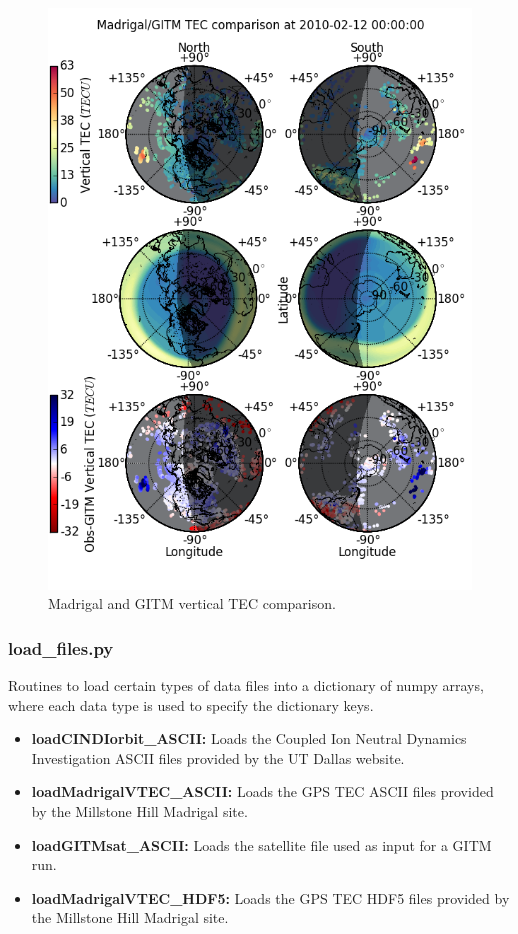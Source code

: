 \begin{figure}
\begin{center}
\noindent\includegraphics[width=.9 \textwidth]{Figures/gitm_tec_comp.png}
\caption{Madrigal and GITM vertical TEC comparison.}
\label{teccomp.fig}
\end{center}
\end{figure}

\subsubsection{load\_files.py}

Routines to load certain types of data files into a dictionary of numpy arrays, where each data type is used to specify the dictionary keys.

\begin{itemize}
\item[]{{\bf loadCINDIorbit\_ASCII: } Loads the Coupled Ion Neutral Dynamics Investigation ASCII files provided by the UT Dallas website.}
\item[]{{\bf loadMadrigalVTEC\_ASCII: } Loads the GPS TEC ASCII files provided by the Millstone Hill Madrigal site.}
\item[]{{\bf loadGITMsat\_ASCII: } Loads the satellite file used as input for a GITM run.}
\item[]{{\bf loadMadrigalVTEC\_HDF5:} Loads the GPS TEC HDF5 files provided by the Millstone Hill Madrigal site.}
\end{itemize}

